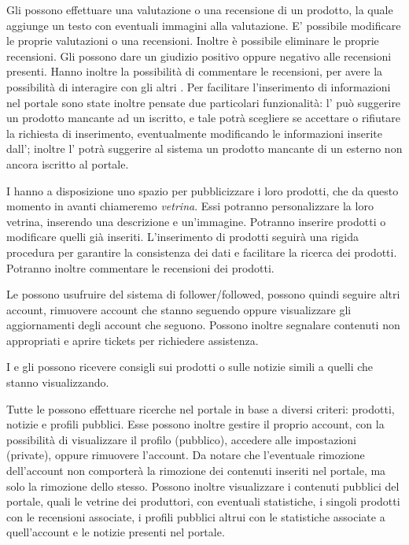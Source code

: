 Gli  possono effettuare una valutazione o una recensione di un prodotto, la quale aggiunge un testo con eventuali immagini alla valutazione. E' possibile modificare le proprie valutazioni o una recensioni. Inoltre è possibile eliminare le proprie recensioni.
Gli  possono dare un giudizio positivo oppure negativo alle recensioni presenti. Hanno inoltre la possibilità di commentare le recensioni, per avere la possibilità di interagire con gli altri .
Per facilitare l'inserimento di informazioni nel portale sono state inoltre pensate due particolari funzionalità: l' può suggerire un prodotto mancante ad un  iscritto, e tale  potrà scegliere se accettare o rifiutare la richiesta di inserimento, eventualmente modificando le informazioni inserite dall'; inoltre l' potrà suggerire al sistema un prodotto mancante di un  esterno non ancora iscritto al portale.

I  hanno a disposizione uno spazio per pubblicizzare i loro prodotti, che da questo momento in avanti chiameremo \emph{vetrina}. Essi potranno personalizzare la loro vetrina, inserendo una descrizione e un'immagine. Potranno inserire prodotti o modificare quelli già inseriti. L'inserimento di prodotti seguirà una rigida procedura per garantire la consistenza dei dati e facilitare la ricerca dei prodotti. Potranno inoltre commentare le recensioni dei prodotti.

\bigskip
Le  possono usufruire del sistema di follower/followed, possono quindi seguire altri account, rimuovere account che stanno seguendo oppure visualizzare gli aggiornamenti degli account che seguono. Possono inoltre segnalare contenuti non appropriati e aprire tickets per richiedere assistenza.

I  e gli  possono ricevere consigli sui prodotti o sulle notizie simili a quelli che stanno visualizzando. 

Tutte le  possono effettuare ricerche nel portale in base a diversi criteri: prodotti, notizie e profili pubblici.
Esse possono inoltre gestire il proprio account, con la possibilità di visualizzare il profilo (pubblico), accedere alle impostazioni (private), oppure rimuovere l'account. Da notare che l'eventuale rimozione dell'account non comporterà la rimozione dei contenuti inseriti nel portale, ma solo la rimozione dello stesso. Possono inoltre visualizzare i contenuti pubblici del portale, quali le vetrine dei produttori, con eventuali statistiche, i singoli prodotti con le recensioni associate, i profili pubblici altrui con le statistiche associate a quell'account e le notizie presenti nel portale.

